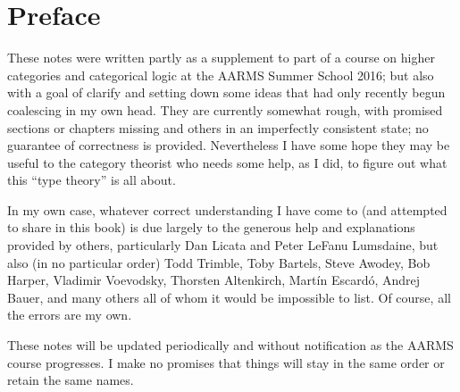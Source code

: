\chapter{Preface}

These notes were written partly as a supplement to part of a course on higher categories and categorical logic at the AARMS Summer School 2016; but also with a goal of clarify and setting down some ideas that had only recently begun coalescing in my own head.
They are currently somewhat rough, with promised sections or chapters missing and others in an imperfectly consistent state; no guarantee of correctness is provided.
Nevertheless I have some hope they may be useful to the category theorist who needs some help, as I did, to figure out what this ``type theory'' is all about.

In my own case, whatever correct understanding I have come to (and attempted to share in this book) is due largely to the generous help and explanations provided by others, particularly Dan Licata and Peter LeFanu Lumsdaine, but also (in no particular order) Todd Trimble, Toby Bartels, Steve Awodey, Bob Harper, Vladimir Voevodsky, Thorsten Altenkirch, Mart\'in Escard\'o, Andrej Bauer, and many others all of whom it would be impossible to list.
Of course, all the errors are my own.

These notes will be updated periodically and without notification as the AARMS course progresses.
I make no promises that things will stay in the same order or retain the same names.


